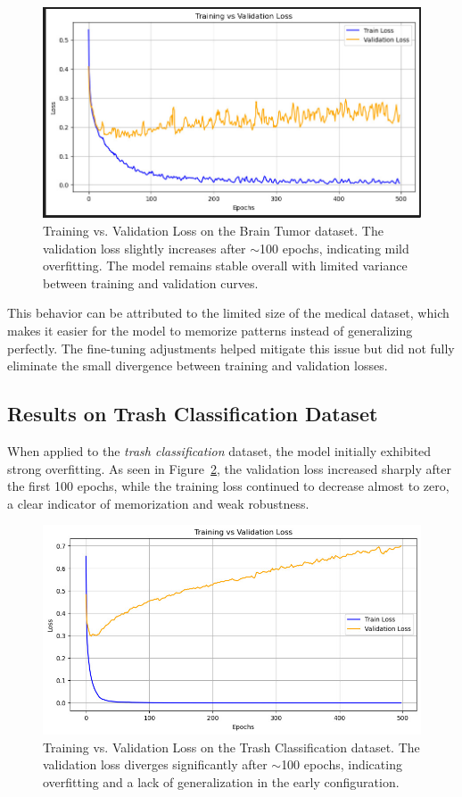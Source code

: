 \documentclass[12pt]{article}
\begin{document}
\begin{figure}[H]
\centering
\includegraphics[width=0.8\linewidth]{loss_curve_before1.jpeg}
\caption{Training vs. Validation Loss on the Brain Tumor dataset. 
The validation loss slightly increases after $\sim$100 epochs, indicating mild overfitting. 
The model remains stable overall with limited variance between training and validation curves.}
\label{fig:brain_tumor_loss}
\end{figure}

This behavior can be attributed to the limited size of the medical dataset, 
which makes it easier for the model to memorize patterns instead of generalizing perfectly. 
The fine-tuning adjustments helped mitigate this issue but did not fully eliminate the small divergence between training and validation losses.

\subsection{Results on Trash Classification Dataset}

When applied to the \textit{trash classification} dataset, 
the model initially exhibited strong overfitting. 
As seen in Figure~\ref{fig:trash_loss}, 
the validation loss increased sharply after the first 100 epochs, 
while the training loss continued to decrease almost to zero, a clear indicator of memorization and weak robustness.

\begin{figure}[H]
\centering
\includegraphics[width=0.8\linewidth]{loss_curve_before2.jpeg}
\caption{Training vs. Validation Loss on the Trash Classification dataset. 
The validation loss diverges significantly after $\sim$100 epochs, 
indicating overfitting and a lack of generalization in the early configuration.}
\label{fig:trash_loss}
\end{figure}
\end{document}
